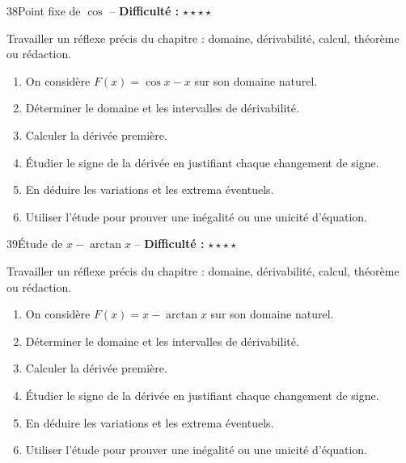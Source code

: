 \documentclass[11pt,a4paper]{article}
\newcommand{\etoiles}[1]{\textbf{Difficulté :} #1}
\begin{document}
\begin{exobox}{38}{Point fixe de $\cos$ -- \etoiles{$\star\star\star\star$}}

\begin{objectifbox}
Travailler un réflexe précis du chapitre : domaine, dérivabilité, calcul, théorème ou rédaction.
\end{objectifbox}

\begin{enumerate}

\item On considère $F(x)=\cos x-x$ sur son domaine naturel.

\item Déterminer le domaine et les intervalles de dérivabilité.

\item Calculer la dérivée première.

\item Étudier le signe de la dérivée en justifiant chaque changement de signe.

\item En déduire les variations et les extrema éventuels.

\item Utiliser l'étude pour prouver une inégalité ou une unicité d'équation.

\end{enumerate}

\end{exobox}


\begin{exobox}{39}{Étude de $x-\arctan x$ -- \etoiles{$\star\star\star\star$}}

\begin{objectifbox}
Travailler un réflexe précis du chapitre : domaine, dérivabilité, calcul, théorème ou rédaction.
\end{objectifbox}

\begin{enumerate}

\item On considère $F(x)=x-\arctan x$ sur son domaine naturel.

\item Déterminer le domaine et les intervalles de dérivabilité.

\item Calculer la dérivée première.

\item Étudier le signe de la dérivée en justifiant chaque changement de signe.

\item En déduire les variations et les extrema éventuels.

\item Utiliser l'étude pour prouver une inégalité ou une unicité d'équation.

\end{enumerate}

\end{exobox}
\end{document}

